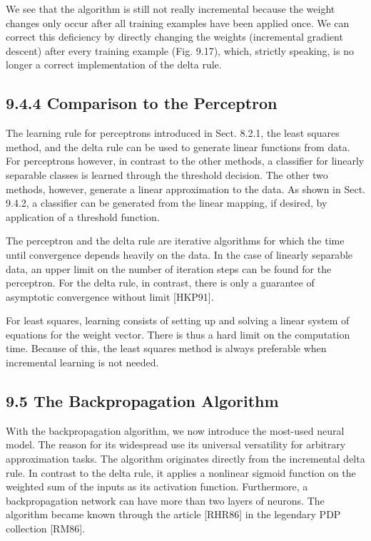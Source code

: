 \documentclass[10pt]{article}
\begin{document}
We see that the algorithm is still not really incremental because the weight changes only occur after all training examples have been applied once. We can correct this deficiency by directly changing the weights (incremental gradient descent) after every training example (Fig. 9.17), which, strictly speaking, is no longer a correct implementation of the delta rule.


\subsection*{9.4.4 Comparison to the Perceptron}
The learning rule for perceptrons introduced in Sect. 8.2.1, the least squares method, and the delta rule can be used to generate linear functions from data. For perceptrons however, in contrast to the other methods, a classifier for linearly separable classes is learned through the threshold decision. The other two methods, however, generate a linear approximation to the data. As shown in Sect. 9.4.2, a classifier can be generated from the linear mapping, if desired, by application of a threshold function.

The perceptron and the delta rule are iterative algorithms for which the time until convergence depends heavily on the data. In the case of linearly separable data, an upper limit on the number of iteration steps can be found for the perceptron. For the delta rule, in contrast, there is only a guarantee of asymptotic convergence without limit [HKP91].

For least squares, learning consists of setting up and solving a linear system of equations for the weight vector. There is thus a hard limit on the computation time. Because of this, the least squares method is always preferable when incremental learning is not needed.

\subsection*{9.5 The Backpropagation Algorithm}
With the backpropagation algorithm, we now introduce the most-used neural model. The reason for its widespread use its universal versatility for arbitrary approximation tasks. The algorithm originates directly from the incremental delta rule. In contrast to the delta rule, it applies a nonlinear sigmoid function on the weighted sum of the inputs as its activation function. Furthermore, a backpropagation network can have more than two layers of neurons. The algorithm became known through the article [RHR86] in the legendary PDP collection [RM86].
\end{document}
